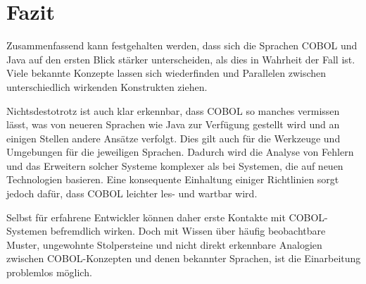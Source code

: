 \section{Fazit}

Zusammenfassend kann festgehalten werden, dass sich die Sprachen COBOL und Java auf den ersten Blick stärker unterscheiden, als dies in Wahrheit der Fall ist. Viele bekannte Konzepte lassen sich wiederfinden und Parallelen zwischen unterschiedlich wirkenden Konstrukten ziehen. 

Nichtsdestotrotz ist auch klar erkennbar, dass COBOL so manches vermissen lässt, was von neueren Sprachen wie Java zur Verfügung gestellt wird und an einigen Stellen andere Ansätze verfolgt. Dies gilt auch für die Werkzeuge und Umgebungen für die jeweiligen Sprachen. Dadurch wird die Analyse von Fehlern und das Erweitern solcher Systeme \idR komplexer als bei Systemen, die auf neuen Technologien basieren. Eine konsequente Einhaltung einiger Richtlinien sorgt jedoch dafür, dass COBOL leichter les- und wartbar wird. 

Selbst für erfahrene Entwickler können daher erste Kontakte mit COBOL-Systemen befremdlich wirken. Doch mit Wissen über häufig beobachtbare Muster, ungewohnte Stolpersteine und nicht direkt erkennbare Analogien zwischen COBOL-Konzepten und denen bekannter Sprachen, ist die Einarbeitung problemlos möglich.